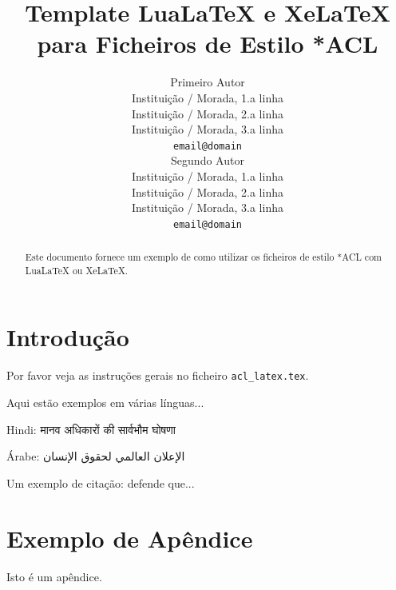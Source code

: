 \documentclass[11pt]{article}
\title{Template LuaLaTeX e XeLaTeX para Ficheiros de Estilo *ACL}
\author{Primeiro Autor \\
    Instituição / Morada, 1.a linha  \\
    Instituição / Morada, 2.a linha  \\
    Instituição / Morada, 3.a linha  \\
  \texttt{email@domain} \\\And
  Segundo Autor \\
    Instituição / Morada, 1.a linha  \\
    Instituição / Morada, 2.a linha  \\
    Instituição / Morada, 3.a linha  \\
  \texttt{email@domain} \\}
\begin{document}
\maketitle
\begin{abstract}
Este documento fornece um exemplo de como
utilizar os ficheiros de estilo *ACL com
LuaLaTeX ou XeLaTeX.
\end{abstract}


\section{Introdução}

Por favor veja as instruções gerais no ficheiro \verb|acl_latex.tex|.

Aqui estão exemplos em várias línguas...

Hindi: \foreignlanguage{hindi}{मानव अधिकारों की सार्वभौम घोषणा}

Árabe: \foreignlanguage{arabic}{الإعلان العالمي لحقوق الإنسان}

Um exemplo de citação:
\citet{Gusfield:97} defende que...




\appendix

\section{Exemplo de Apêndice}
\label{sec:appendix}

Isto é um apêndice.
\end{document}
